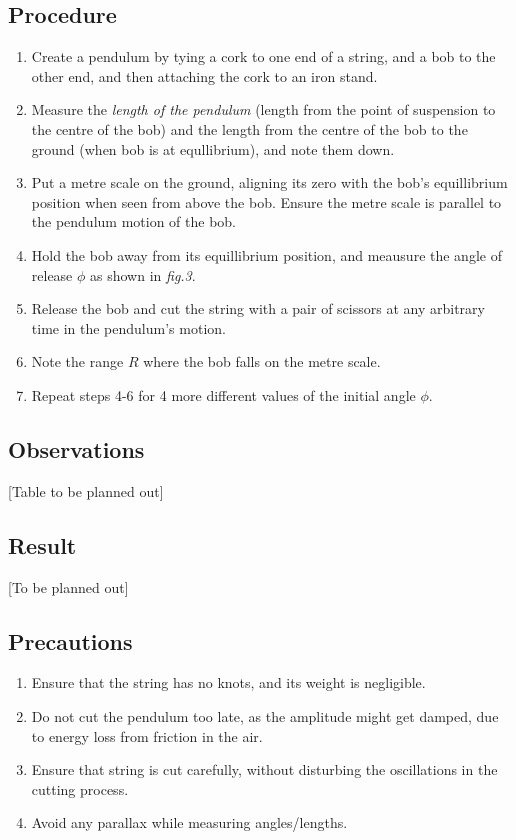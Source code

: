 \subsection{Procedure}
\begin{enumerate}
\item Create a pendulum by tying a cork to one end of a string, and a bob to the other end, and then attaching the cork to an iron stand.
\item Measure the \emph{length of the pendulum} (length from the point of suspension to the centre of the bob) and the length from the centre of the bob to the ground (when bob is at equllibrium), and note them down.
  \item Put a metre scale on the ground, aligning its zero with the bob's equillibrium position when seen from above the bob. Ensure the metre scale is parallel to the pendulum motion of the bob.
\item Hold the bob away from its equillibrium position, and meausure the angle of release $\phi$ as shown in \emph{fig.3}.
\item Release the bob and cut the string with a pair of scissors at any arbitrary time in the pendulum's motion.
\item Note the range $R$ where the bob falls on the metre scale.
\item Repeat steps 4-6 for 4 more different values of the initial angle $\phi$.
\end{enumerate}
\subsection{Observations}
[Table to be planned out]
\subsection{Result}
[To be planned out]
\subsection{Precautions}
\begin{enumerate}
\item Ensure that the string has no knots, and its weight is negligible.
\item Do not cut the pendulum too late, as the amplitude might get damped, due to energy loss from friction in the air.
\item Ensure that string is cut carefully, without disturbing the oscillations in the cutting process.
\item Avoid any parallax while measuring angles/lengths.
\end{enumerate}



  

                                                                           
